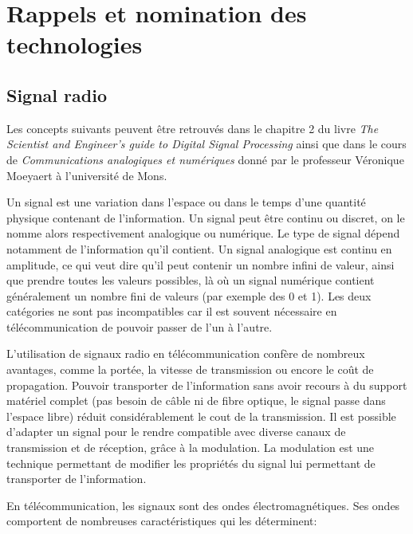 \renewcommand{\leftmark}{NOMINATION DES TECHNOLOGIES}


\chapter{Rappels et nomination des technologies}\label{chap1}

\section{Signal radio}

Les concepts suivants peuvent être retrouvés dans le chapitre 2 du livre \textit{The Scientist and Engineer's guide to Digital Signal Processing} \cite{book2} ainsi que dans le cours de \textit{Communications analogiques et numériques} donné par le professeur Véronique Moeyaert à l'université de Mons.

\vspace{0.1cm}

Un signal est une variation dans l'espace ou dans le temps d'une quantité physique contenant de l'information. Un signal peut être continu ou discret, on le nomme alors respectivement analogique ou numérique. Le type de signal dépend notamment de l'information qu'il contient. Un signal analogique est continu en amplitude, ce qui veut dire qu'il peut contenir un nombre infini de valeur, ainsi que prendre toutes les valeurs possibles, là où un signal numérique contient généralement un nombre fini de valeurs (par exemple des 0 et 1).
Les deux catégories ne sont pas incompatibles car il est souvent nécessaire en télécommunication de pouvoir passer de l'un à l'autre.

\vspace{0.1cm}

L'utilisation de signaux radio en télécommunication confère de nombreux avantages, comme la portée, la vitesse de transmission  ou encore le coût de propagation. Pouvoir transporter de l'information sans avoir recours à du support matériel complet (pas besoin de câble ni de fibre optique, le signal passe dans l'espace libre) réduit considérablement le cout de la transmission. Il est possible d'adapter un signal pour le rendre compatible avec diverse canaux de transmission et de réception, grâce à la modulation. La modulation est une technique permettant de modifier les propriétés du signal lui permettant de transporter de l'information.

\newpage

En télécommunication, les signaux sont des ondes électromagnétiques. Ses ondes comportent de nombreuses caractéristiques qui les déterminent: 

